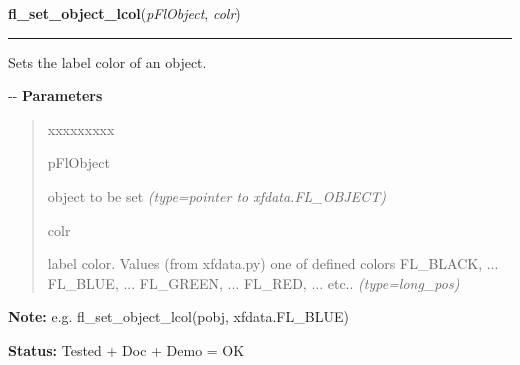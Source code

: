 \hspace{.8\funcindent}\begin{boxedminipage}{\funcwidth}

    \raggedright \textbf{fl\_set\_object\_lcol}(\textit{pFlObject}, \textit{colr})

    \vspace{-1.5ex}

    \rule{\textwidth}{0.5\fboxrule}
\setlength{\parskip}{2ex}

Sets the label color of an object.

-{}-
\setlength{\parskip}{1ex}
      \textbf{Parameters}
      \vspace{-1ex}

      \begin{quote}
        \begin{Ventry}{xxxxxxxxx}

          \item[pFlObject]


object to be set
            {\it (type=pointer to xfdata.FL\_OBJECT)}

          \item[colr]


label color. Values (from xfdata.py) one of defined colors
FL\_BLACK, ... FL\_BLUE, ... FL\_GREEN, ... FL\_RED, ... etc..
            {\it (type=long\_pos)}

        \end{Ventry}

      \end{quote}

\textbf{Note:} 
e.g. fl\_set\_object\_lcol(pobj, xfdata.FL\_BLUE)


\textbf{Status:} 
Tested + Doc + Demo = OK


    \end{boxedminipage}

    \label{xformslib:flbasic:fl_set_object_lcol}

    \vspace{0.5ex}

